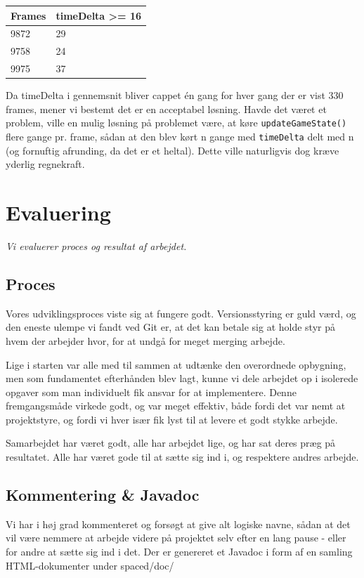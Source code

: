 \documentclass[titlepage,danish]{article}
\newcommand{\code}[1]{\texttt{#1}}
\begin{document}
\begin{center}
    \begin{tabular}{ | l | l |}
    \hline
    Frames & timeDelta \textgreater= 16  \\ \hline
    9872 & 29 \\ \hline
    9758 & 24  \\ \hline
    9975 & 37  \\
    \hline
    \end{tabular}
\end{center}

Da timeDelta i gennemsnit bliver cappet én gang for hver gang der er vist 330 frames, mener vi bestemt det er en acceptabel løsning.
Havde det været et problem, ville en mulig løsning på problemet være, at køre \code{updateGameState()} flere gange pr. frame, sådan at den blev kørt n gange med \code{timeDelta} delt med n (og fornuftig afrunding, da det er et heltal). Dette ville naturligvis dog kræve yderlig regnekraft.

\section{Evaluering} \label{Evaluering}
\emph{Vi evaluerer proces og resultat af arbejdet.}
\subsection{Proces}
Vores udviklingsproces viste sig at fungere godt. Versionsstyring er guld værd, og den eneste
ulempe vi fandt ved Git er, at det kan betale sig at holde styr på hvem der arbejder hvor, for at
undgå for meget merging arbejde.

Lige i starten var alle med til sammen at udtænke den overordnede opbygning, men som fundamentet
efterhånden blev lagt, kunne vi dele arbejdet op i isolerede opgaver som man individuelt fik ansvar
for at implementere. Denne fremgangsmåde virkede godt, og var meget effektiv, både fordi det var
nemt at projektstyre, og fordi vi hver især fik lyst til at levere et godt stykke arbejde.

Samarbejdet har været godt, alle har arbejdet lige, og har sat deres præg på resultatet. Alle har været
gode til at sætte sig ind i, og respektere andres arbejde.

\subsection{Kommentering \& Javadoc}
Vi har i høj grad kommenteret og forsøgt at give alt logiske navne, sådan at det vil være nemmere at arbejde videre på projektet selv efter en lang pause - eller for andre at sætte sig ind i det. Der er genereret et Javadoc i form af en samling HTML-dokumenter under spaced/doc/
\end{document}

